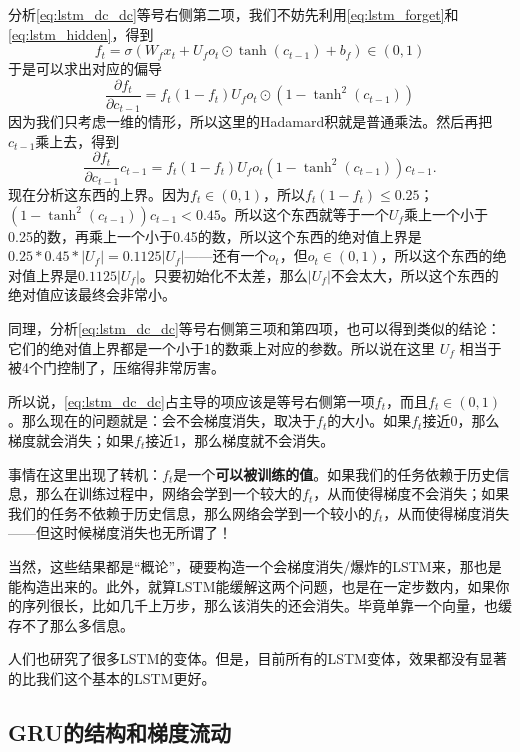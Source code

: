 分析\eqref{eq:lstm_dc_dc}等号右侧第二项，我们不妨先利用\eqref{eq:lstm_forget}和\eqref{eq:lstm_hidden}，得到
\begin{equation}
    f_t = \sigma(W_f x_t + U_f o_t\odot \tanh(c_{t-1}) + b_f) \in (0, 1)
\end{equation}
于是可以求出对应的偏导
\begin{equation}
    \frac{\partial f_t}{\partial c_{t-1}} = f_t(1 - f_t) U_f o_t \odot (1-\tanh^2(c_{t-1}))
\end{equation}
因为我们只考虑一维的情形，所以这里的Hadamard积就是普通乘法。然后再把$c_{t-1}$乘上去，得到
\begin{equation}
    \frac{\partial f_t}{\partial c_{t-1}} c_{t-1} = f_t(1 - f_t) U_f o_t (1-\tanh^2(c_{t-1})) c_{t-1}.
\end{equation}
现在分析这东西的上界。因为$f_t \in (0, 1)$，所以$f_t(1 - f_t) \le 0.25$；$(1-\tanh^2(c_{t-1})) c_{t-1} < 0.45$。所以这个东西就等于一个$U_f$乘上一个小于0.25的数，再乘上一个小于0.45的数，所以这个东西的绝对值上界是$0.25 * 0.45 * |U_f| = 0.1125 |U_f|$——还有一个$o_t$，但$o_t \in (0, 1)$，所以这个东西的绝对值上界是$0.1125 |U_f|$。只要初始化不太差，那么$|U_f|$不会太大，所以这个东西的绝对值应该最终会非常小。

同理，分析\eqref{eq:lstm_dc_dc}等号右侧第三项和第四项，也可以得到类似的结论：它们的绝对值上界都是一个小于1的数乘上对应的参数。所以说在这里 $U_f$ 相当于被4个门控制了，压缩得非常厉害。

所以说，\eqref{eq:lstm_dc_dc}占主导的项应该是等号右侧第一项$f_t$，而且$f_t \in (0, 1)$。那么现在的问题就是：会不会梯度消失，取决于$f_t$的大小。如果$f_t$接近0，那么梯度就会消失；如果$f_t$接近1，那么梯度就不会消失。

事情在这里出现了转机：$f_t$是一个\textbf{可以被训练的值}。如果我们的任务依赖于历史信息，那么在训练过程中，网络会学到一个较大的$f_t$，从而使得梯度不会消失；如果我们的任务不依赖于历史信息，那么网络会学到一个较小的$f_t$，从而使得梯度消失——但这时候梯度消失也无所谓了！

当然，这些结果都是“概论”，硬要构造一个会梯度消失/爆炸的LSTM来，那也是能构造出来的。此外，就算LSTM能缓解这两个问题，也是在一定步数内，如果你的序列很长，比如几千上万步，那么该消失的还会消失。毕竟单靠一个向量，也缓存不了那么多信息。

人们也研究了很多LSTM的变体。但是，目前所有的LSTM变体，效果都没有显著的比我们这个基本的LSTM更好。

\subsection{GRU的结构和梯度流动}

